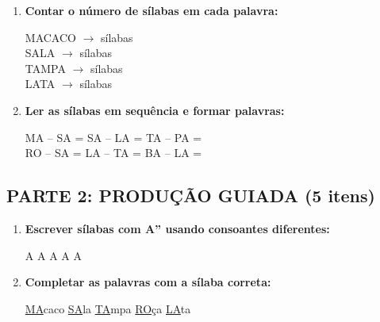 \begin{exercicio}
\begin{enumerate}
  \item \textbf{Contar o número de sílabas em cada palavra:}
  \begin{center}
  MACACO $\rightarrow$ \underline{\hspace{1cm}} sílabas \\
  SALA $\rightarrow$ \underline{\hspace{1cm}} sílabas \\
  TAMPA $\rightarrow$ \underline{\hspace{1cm}} sílabas \\
  LATA $\rightarrow$ \underline{\hspace{1cm}} sílabas
  \end{center}

  \item \textbf{Ler as sílabas em sequência e formar palavras:}
  \begin{center}
  MA -- SA = \underline{\hspace{2cm}} \quad SA -- LA = \underline{\hspace{2cm}} \quad TA -- PA = \underline{\hspace{2cm}} \\
  RO -- SA = \underline{\hspace{2cm}} \quad LA -- TA = \underline{\hspace{2cm}} \quad BA -- LA = \underline{\hspace{2cm}}
  \end{center}
\end{enumerate}

\subsection*{PARTE 2: PRODUÇÃO GUIADA (5 itens)}

\begin{enumerate}[resume]
  \item \textbf{Escrever sílabas com A'' usando consoantes diferentes:}
  \begin{center}
  \underline{\hspace{1.5cm}}A \quad \underline{\hspace{1.5cm}}A \quad \underline{\hspace{1.5cm}}A \quad \underline{\hspace{1.5cm}}A \quad \underline{\hspace{1.5cm}}A
  \end{center}

  \item \textbf{Completar as palavras com a sílaba correta:}
  \begin{center}
  \underline{MA}caco \quad \underline{SA}la \quad \underline{TA}mpa \quad \underline{RO}ça \quad \underline{LA}ta
  \end{center}


\end{enumerate}
\end{exercicio}
